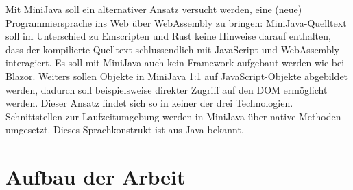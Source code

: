Mit MiniJava soll ein alternativer Ansatz versucht werden, eine (neue) Programmiersprache ins Web über WebAssembly zu bringen: MiniJava-Quelltext soll im Unterschied zu Emscripten und Rust keine Hinweise darauf enthalten, dass der kompilierte Quelltext schlussendlich mit JavaScript und WebAssembly interagiert. Es soll mit MiniJava auch kein Framework aufgebaut werden wie bei Blazor. Weiters sollen Objekte in MiniJava 1:1 auf JavaScript-Objekte abgebildet werden, dadurch soll beispielsweise direkter Zugriff auf den DOM ermöglicht werden. Dieser Ansatz findet sich so in keiner der drei Technologien. Schnittstellen zur Laufzeitumgebung werden in MiniJava über native Methoden umgesetzt. Dieses Sprachkonstrukt ist aus Java bekannt.

\section{Aufbau der Arbeit}

